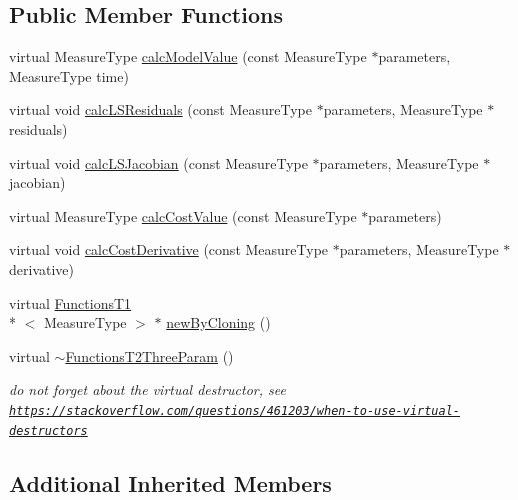 \subsection*{Public Member Functions}
\begin{DoxyCompactItemize}
\item 
virtual Measure\-Type \hyperlink{class_ox_1_1_functions_t2_three_param_a9a8993ec4989baba34477466f4f89f37}{calc\-Model\-Value} (const Measure\-Type $\ast$parameters, Measure\-Type time)
\item 
virtual void \hyperlink{class_ox_1_1_functions_t2_three_param_acfdbb8fda27ef93c5f7a078bbe91d6db}{calc\-L\-S\-Residuals} (const Measure\-Type $\ast$parameters, Measure\-Type $\ast$residuals)
\item 
virtual void \hyperlink{class_ox_1_1_functions_t2_three_param_a3da422c27edb0ea7a134d60d3aef053c}{calc\-L\-S\-Jacobian} (const Measure\-Type $\ast$parameters, Measure\-Type $\ast$jacobian)
\item 
virtual Measure\-Type \hyperlink{class_ox_1_1_functions_t2_three_param_a54a80f7ef5c1bab880880a573eccb4c5}{calc\-Cost\-Value} (const Measure\-Type $\ast$parameters)
\item 
virtual void \hyperlink{class_ox_1_1_functions_t2_three_param_af9f6d2b040f362210171bbb7807fdeb7}{calc\-Cost\-Derivative} (const Measure\-Type $\ast$parameters, Measure\-Type $\ast$derivative)
\item 
virtual \hyperlink{class_ox_1_1_functions_t1}{Functions\-T1}\\*
$<$ Measure\-Type $>$ $\ast$ \hyperlink{class_ox_1_1_functions_t2_three_param_a176d8bde5411b875258beaf07668cd39}{new\-By\-Cloning} ()
\item 
\hypertarget{class_ox_1_1_functions_t2_three_param_a43b8d2a7e125b10ddbef08f59b74f425}{virtual \hyperlink{class_ox_1_1_functions_t2_three_param_a43b8d2a7e125b10ddbef08f59b74f425}{$\sim$\-Functions\-T2\-Three\-Param} ()}\label{class_ox_1_1_functions_t2_three_param_a43b8d2a7e125b10ddbef08f59b74f425}

\begin{DoxyCompactList}\small\item\em do not forget about the virtual destructor, see \href{https://stackoverflow.com/questions/461203/when-to-use-virtual-destructors}{\tt https\-://stackoverflow.\-com/questions/461203/when-\/to-\/use-\/virtual-\/destructors} \end{DoxyCompactList}\end{DoxyCompactItemize}
\subsection*{Additional Inherited Members}


